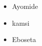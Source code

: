 \documentclass{article}
\begin{document}
	
	\begin{itemize}
		\item Ayomide
		\item kamsi
		\item Eboseta
	\end{itemize}
\end{document}
